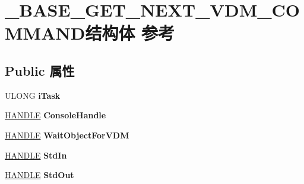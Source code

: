 \hypertarget{struct___b_a_s_e___g_e_t___n_e_x_t___v_d_m___c_o_m_m_a_n_d}{}\section{\+\_\+\+B\+A\+S\+E\+\_\+\+G\+E\+T\+\_\+\+N\+E\+X\+T\+\_\+\+V\+D\+M\+\_\+\+C\+O\+M\+M\+A\+N\+D结构体 参考}
\label{struct___b_a_s_e___g_e_t___n_e_x_t___v_d_m___c_o_m_m_a_n_d}
\subsection*{Public 属性}
\begin{DoxyCompactItemize}
\item 
\mbox{\label{struct___b_a_s_e___g_e_t___n_e_x_t___v_d_m___c_o_m_m_a_n_d_a6245a111343ab6960514a5e55338472b}} 
U\+L\+O\+NG {\bfseries i\+Task}
\item 
\mbox{\label{struct___b_a_s_e___g_e_t___n_e_x_t___v_d_m___c_o_m_m_a_n_d_a2eb665293e970e68c8df7e03a75da380}} 
\hyperlink{interfacevoid}{H\+A\+N\+D\+LE} {\bfseries Console\+Handle}
\item 
\mbox{\label{struct___b_a_s_e___g_e_t___n_e_x_t___v_d_m___c_o_m_m_a_n_d_a053fc999f7a6ed3d6a4036329ac216ef}} 
\hyperlink{interfacevoid}{H\+A\+N\+D\+LE} {\bfseries Wait\+Object\+For\+V\+DM}
\item 
\mbox{\label{struct___b_a_s_e___g_e_t___n_e_x_t___v_d_m___c_o_m_m_a_n_d_a56f05a7bf5fd52012b13cb685680215d}} 
\hyperlink{interfacevoid}{H\+A\+N\+D\+LE} {\bfseries Std\+In}
\item 
\mbox{\label{struct___b_a_s_e___g_e_t___n_e_x_t___v_d_m___c_o_m_m_a_n_d_ad4f656a31ad9670aa3d03d071b513048}} 
\hyperlink{interfacevoid}{H\+A\+N\+D\+LE} {\bfseries Std\+Out}
\item 
\mbox{\label{struct___b_a_s_e___g_e_t___n_e_x_t___v_d_m___c_o_m_m_a_n_d_a5efc1382df28784ae9baeaaf91a85266}} 

\end{DoxyCompactItemize}
